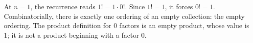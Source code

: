At $ n=1 $, the recurrence reads $ 1!=1\cdot0!$. Since $ 1!=1 $, it forces $\boxed{0!=1}$. Combinatorially, there is exactly one ordering of an empty collection: the empty ordering. The product definition for 0 factors is an empty product, whose value is 1; it is not a product beginning with a factor 0.
